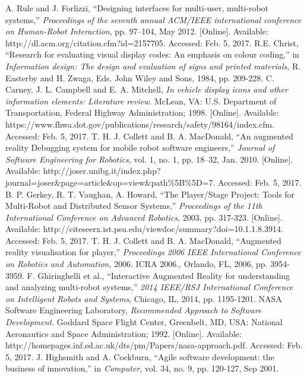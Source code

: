\documentclass[titlepage,hidelinks,10pt]{article}
\begin{document}
\begin{thebibliography}{1}
 A. Rule and J. Forlizzi, ``Designing interfaces for multi-user, multi-robot systems,'' \textit{Proceedings of the seventh annual ACM/IEEE international conference on Human-Robot Interaction}, pp. 97–104, May 2012. [Online]. Available: http://dl.acm.org/citation.cfm?id=2157705. Accessed: Feb. 5, 2017. 
 R.E. Christ, ``Research for evaluating visual display codes: An emphasis on colour coding,'' in \textit{Information design: The design and evaluation of signs and printed materials}, R. Easterby and H. Zwaga, Eds. John Wiley and Sons, 1984, pp. 209-228.
 C. Carney, J. L. Campbell and E. A. Mitchell, \textit{In vehicle display icons and other information elements: Literature review}. McLean, VA: U.S. Department of Transportation, Federal Highway Administration; 1998. [Online]. Available: https://www.fhwa.dot.gov/publications/research/safety/98164/index.cfm. Accessed: Feb. 5, 2017.
 T. H. J. Collett and B. A. MacDonald, ``An augmented reality Debugging system for mobile robot software engineers,'' \textit{Journal of Software Engineering for Robotics}, vol. 1, no. 1, pp. 18–32, Jan. 2010. [Online]. Available: http://joser.unibg.it/index.php?journal=joser\&page=article\&op=view\&path\%5B\%5D=7. Accessed: Feb. 5, 2017.
 B. P. Gerkey, R. T. Vaughan, A. Howard, ``The Player/Stage Project: Tools for Multi-Robot and Distributed Sensor Systems,'' \textit{Proceedings of the 11th International Conference on Advanced Robotics}, 2003, pp. 317-323. [Online]. Available: http://citeseerx.ist.psu.edu/viewdoc/summary?doi=10.1.1.8.3914. Accessed: Feb. 5, 2017.
 T. H. J. Collett and B. A. MacDonald, ``Augmented reality visualisation for player,'' \textit{Proceedings 2006 IEEE International Conference on Robotics and Automation}, 2006. ICRA 2006., Orlando, FL, 2006, pp. 3954-3959.
 F. Ghiringhelli et al., ``Interactive Augmented Reality for understanding and analyzing multi-robot systems,'' \textit{2014 IEEE/RSJ International Conference on Intelligent Robots and Systems}, Chicago, IL, 2014, pp. 1195-1201.
 NASA Software Engineering Laboratory, \textit{Recommended Approach to Software Development}. Goddard Space Flight Center, Greenbelt, MD, USA: National Aeronautics and Space Administration; 1992. [Online]. Available: http://homepages.inf.ed.ac.uk/dts/pm/Papers/nasa-approach.pdf. Accessed: Feb. 5, 2017.
 J. Highsmith and A. Cockburn, ``Agile software development: the business of innovation,'' in \textit{Computer}, vol. 34, no. 9, pp. 120-127, Sep 2001.
\end{thebibliography}
\end{document}

